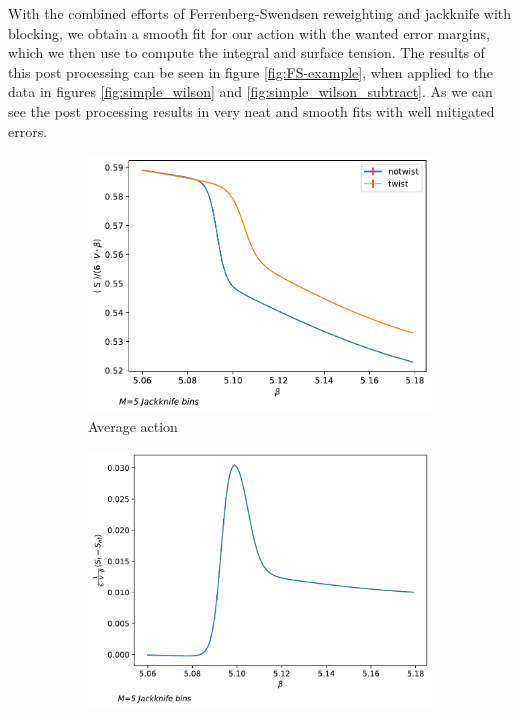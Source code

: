 \documentclass[english,twoside,openright]{UH_TCM_MSc}
\begin{document}
With the combined efforts of Ferrenberg-Swendsen reweighting and jackknife with blocking, we obtain a smooth fit for our action with the wanted error margins, which we then use to compute the integral and surface tension. The results of this post processing can be seen in figure \ref{fig:FS-example}, when applied to the data in figures \ref{fig:simple_wilson} and \ref{fig:simple_wilson_subtract}. As we can see the post processing results in very neat and smooth fits with well mitigated errors.
\begin{figure}[htpb]
    \centering
    \begin{subfigure}[t]{0.65\textwidth}
        \centering
        \includegraphics[width=\textwidth]{final_plots/su3_fs_reweight/action.pdf}
        \caption{Average action}
        \label{fig:fs-reweight-action}
    \end{subfigure}
    \begin{subfigure}[t]{0.65\textwidth}
        \centering  
        \includegraphics[width=\textwidth]{final_plots/su3_fs_reweight/difference.pdf}

\end{subfigure}
\end{figure}
\end{document}
